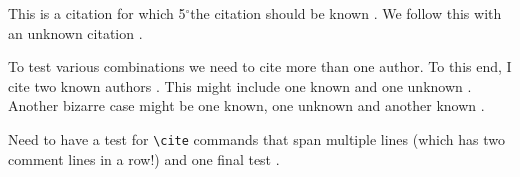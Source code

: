 \documentclass{article}
\renewcommand{\deg}{\ensuremath{^\circ}} %
\begin{document}
This is a citation for which 5\deg the citation should be known \cite{known}.
We follow this with an unknown citation \cite{unknown}.

To test various combinations we need to cite more than one author.  To this
end, I cite two known authors \cite{known,known2}.  This might include one
known and one unknown \cite{unknown,known}.  Another bizarre case might be
one known, one unknown and another known \cite{known,unknown,known2}.

Need to have a test for \verb#\cite# commands that span multiple lines \cite{
known,%
known2} (which has two comment lines in a row!) and one final test \cite{%
known, %
known2%
}.



\end{document}
